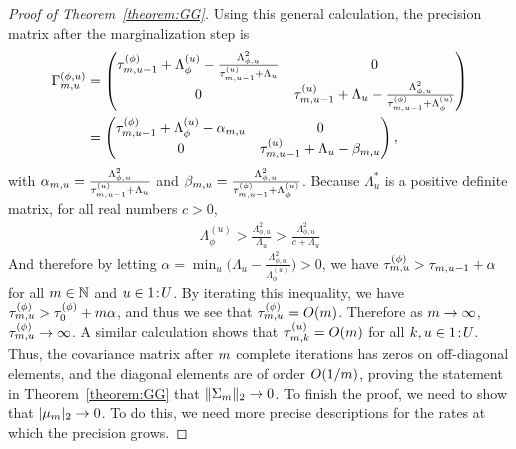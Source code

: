 \documentclass[12pt]{article}\usepackage[]{graphicx}\usepackage[]{xcolor}
\begin{document}
\begin{appendices}
\begin{proof}[Proof of Theorem~\ref{theorem:GG}]
Using this general calculation, the precision matrix after the marginalization step is
\begin{align}
 \Gamma^{(\phi, u)}_{m, u} &= \begin{pmatrix}
    \tau_{m, u-1}^{(\phi)} + \Lambda_{\phi}^{(u)} - \frac{\Lambda_{\phi, u}^2}{\tau_{m, u-1}^{(u)} + \Lambda_u} & 0 \\
    0 & \tau_{m, u-1}^{(u)} + \Lambda_u - \frac{\Lambda_{\phi, u}^2}{\tau_{m, u-1}^{(\phi)} + \Lambda^{(u)}_{\phi}}
   \end{pmatrix} \nonumber \\
   &= \begin{pmatrix}
    \tau_{m, u-1}^{(\phi)} + \Lambda_{\phi}^{(u)} - \alpha_{m, u} & 0 \\
    0 & \tau_{m, u-1}^{(u)} + \Lambda_u - \beta_{m, u}
   \end{pmatrix},\label{eq:margPrecision}
\end{align}
with $\alpha_{m, u} = \frac{\Lambda_{\phi, u}^2}{\tau_{m, u-1}^{(u)} + \Lambda_u}$ and $\beta_{m, u} = \frac{\Lambda_{\phi, u}^2}{\tau_{m, u-1}^{(\phi)} + \Lambda^{(u)}_{\phi}}$. Because $\Lambda^*_u$ is a positive definite matrix, for all real numbers $c > 0$,
\begin{align*}
    \Lambda_{\phi}^{(u)} > \frac{\Lambda^2_{\phi, u}}{\Lambda_{u}} > \frac{\Lambda^2_{\phi, u}}{c + \Lambda_{u}}
  \end{align*}
And therefore by letting $\alpha = \min_u \big(\Lambda_u - \frac{\Lambda^2_{\phi, u}}{\Lambda^{(u)}_{\phi}}\big) > 0$, we have $\tau_{m, u}^{(\phi)} > \tau_{m, u-1} + \alpha$ for all $m \in \mathbb{N}$ and $u \in {1}\!:\!{U}$.
By iterating this inequality, we have $\tau_{m, u}^{(\phi)} > \tau^{(\phi)}_0 + m\alpha$, and thus we see that $\tau_{m, u}^{(\phi)} = O(m)$.
Therefore as $m \rightarrow \infty$, $\tau_{m, u}^{(\phi)} \rightarrow \infty$.
A similar calculation shows that $\tau_{m, k}^{(u)} = O(m)$ for all $k, u \in {1}\!:\!{U}$.
Thus, the covariance matrix after $m$ complete iterations has zeros on off-diagonal elements, and the diagonal elements are of order $O(1/m)$, proving the statement in Theorem~\ref{theorem:GG} that $\|\Sigma_m\|_2 \rightarrow 0$.
To finish the proof, we need to show that $|\mu_m|_2 \rightarrow 0$.
To do this, we need more precise descriptions for the rates at which the precision grows.


\end{proof}
\end{appendices}
\end{document}
